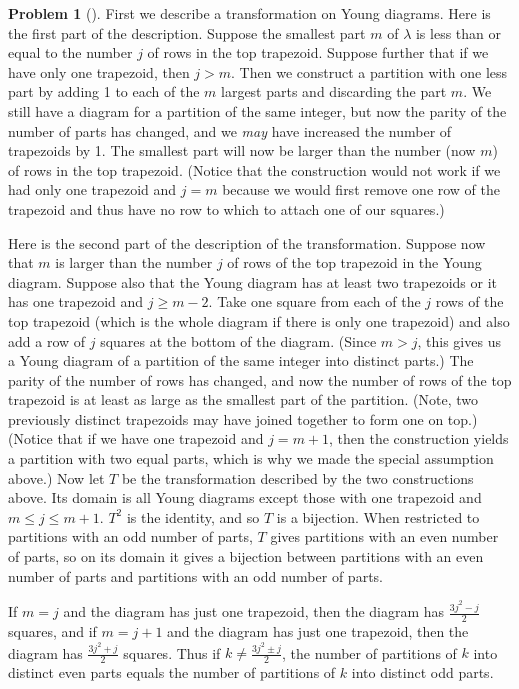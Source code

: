 \documentclass[10pt,]{book}
\theoremstyle{plain}
\theoremstyle{definition}
\newtheorem{activity}[project]{Problem}
\theoremstyle{definition}
\numberwithin{equation}{chapter}
\begin{document}
\begin{activity}[]
\par
First we describe a transformation on Young diagrams. Here is the first part of the description. Suppose the smallest part \(m\) of \(\lambda\) is less than or equal to the number \(j\) of rows in the top trapezoid. Suppose further that if we have only one trapezoid, then \(j>m\). Then we construct a partition with one less part by adding 1 to each of the \(m\) largest parts and discarding the part \(m\). We still have a diagram for a partition of the same integer, but now the parity of the number of parts has changed, and we \emph{may} have increased the number of trapezoids by 1. The smallest part will now be larger than the number (now \(m\)) of rows in the top trapezoid. (Notice that the construction would not work if we had only one trapezoid and \(j=m\) because we would first remove one row of the trapezoid and thus have no row to which to attach one of our squares.)%
\par
Here is the second part of the description of the transformation. Suppose now that \(m\) is larger than the number \(j\) of rows of the top trapezoid in the Young diagram. Suppose also that the Young diagram has at least two trapezoids or it has one trapezoid and \(j\ge m-2\). Take one square from each of the \(j\) rows of the top trapezoid (which is the whole diagram if there is only one trapezoid) and also add a row of \(j\) squares at the bottom of the diagram. (Since \(m>j\), this gives us a Young diagram of a partition of the same integer into distinct parts.) The parity of the number of rows has changed, and now the number of rows of the top trapezoid is at least as large as the smallest part of the partition. (Note, two previously distinct trapezoids may have joined together to form one on top.)  (Notice that if we have one trapezoid and \(j= m+1\), then the construction yields a partition with two equal parts, which is why we made the special assumption above.) Now let \(T\) be the transformation described by the two constructions above. Its domain is all Young diagrams except those with one trapezoid and \(m\le j\le m+1\). \(T^2\) is the identity, and so \(T\) is a bijection.  When restricted to partitions with an odd number of parts, \(T\) gives partitions with an even number of parts, so on its domain it gives a bijection between partitions with an even number of parts and partitions with an odd number of parts.%
\par
If \(m=j\) and the diagram has just one trapezoid, then the diagram has \(\frac{3j^2-j}{2}\) squares, and if \(m=j+1\) and the diagram has just one trapezoid, then the diagram has \(\frac{3j^2+j}{2}\) squares. Thus if \(k\ne \frac{3j^2\pm j}{2}\), the number of partitions of \(k\) into distinct even parts equals the number of partitions of \(k\) into distinct odd parts.%

\end{activity}
\end{document}
